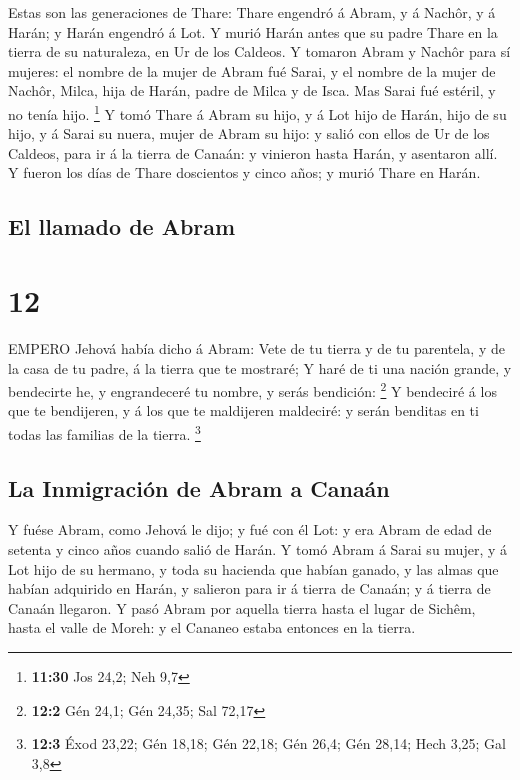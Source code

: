 Estas son las generaciones de Thare: Thare engendró á
Abram, y á Nachôr, y á Harán; y Harán engendró á Lot.  Y
murió Harán antes que su padre Thare en la tierra de su naturaleza, en
Ur de los Caldeos.  Y tomaron Abram y Nachôr para sí
mujeres: el nombre de la mujer de Abram fué Sarai, y el nombre de la
mujer de Nachôr, Milca, hija de Harán, padre de Milca y de Isca.
 Mas Sarai fué estéril, y no tenía hijo. \footnote{\textbf{11:30}
  Jos 24,2; Neh 9,7}  Y tomó Thare á Abram su hijo, y á Lot
hijo de Harán, hijo de su hijo, y á Sarai su nuera, mujer de Abram su
hijo: y salió con ellos de Ur de los Caldeos, para ir á la tierra de
Canaán: y vinieron hasta Harán, y asentaron allí.  Y fueron
los días de Thare doscientos y cinco años; y murió Thare en Harán.

\hypertarget{el-llamado-de-abram}{%
\subsection{El llamado de Abram}\label{el-llamado-de-abram}}

\hypertarget{section-11}{%
\section{12}\label{section-11}}

 EMPERO Jehová había dicho á Abram: Vete de tu tierra y de
tu parentela, y de la casa de tu padre, á la tierra que te mostraré;
 Y haré de ti una nación grande, y bendecirte he, y
engrandeceré tu nombre, y serás bendición: \footnote{\textbf{12:2} Gén
  24,1; Gén 24,35; Sal 72,17}  Y bendeciré á los que te
bendijeren, y á los que te maldijeren maldeciré: y serán benditas en ti
todas las familias de la tierra. \footnote{\textbf{12:3} Éxod 23,22; Gén
  18,18; Gén 22,18; Gén 26,4; Gén 28,14; Hech 3,25; Gal 3,8}

\hypertarget{la-inmigraciuxf3n-de-abram-a-canauxe1n}{%
\subsection{La Inmigración de Abram a
Canaán}\label{la-inmigraciuxf3n-de-abram-a-canauxe1n}}

 Y fuése Abram, como Jehová le dijo; y fué con él Lot: y era
Abram de edad de setenta y cinco años cuando salió de Harán.
 Y tomó Abram á Sarai su mujer, y á Lot hijo de su hermano,
y toda su hacienda que habían ganado, y las almas que habían adquirido
en Harán, y salieron para ir á tierra de Canaán; y á tierra de Canaán
llegaron.  Y pasó Abram por aquella tierra hasta el lugar de
Sichêm, hasta el valle de Moreh: y el Cananeo estaba entonces en la
tierra.

